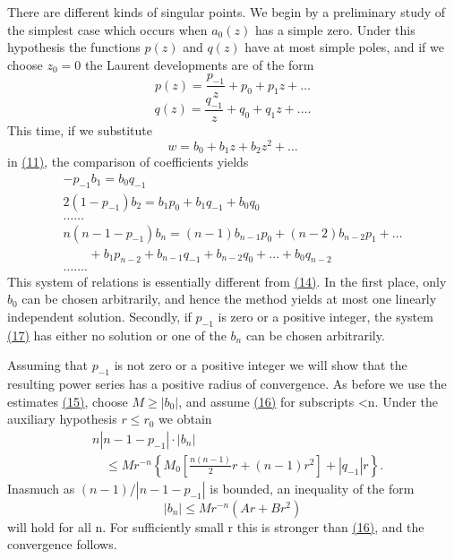 There are different kinds of singular points. We begin by a preliminary study of the simplest case which occurs when $a_{0}(z)$ has a simple zero. Under this hypothesis the functions $p(z)$ and $q(z)$ have at most simple poles, and if we choose $z_{0}=0$ the Laurent developments are of the form
\begin{equation*}
p (z) = \frac {p _ {- 1}}{z} + p _ {0} + p _ {1} z + \dots
\end{equation*}
\begin{equation*}
q (z) = \frac {q _ {- 1}}{z} + q _ {0} + q _ {1} z + \dots .
\end{equation*}
This time, if we substitute
\begin{equation*}
w = b _ {0} + b _ {1} z + b _ {2} z ^ {2} + \dots
\end{equation*}
in \hyperref[eq:8.11]{(11)}, the comparison of coefficients yields
\begin{equation*}
\begin{array}{l} - p _ {- 1} b _ {1} = b _ {0} q _ {- 1} \\ 2 (1 - p _ {- 1}) b _ {2} = b _ {1} p _ {0} + b _ {1} q _ {- 1} + b _ {0} q _ {0} \\ \dots \dots \\ n (n - 1 - p _ {- 1}) b _ {n} = (n - 1) b _ {n - 1} p _ {0} + (n - 2) b _ {n - 2} p _ {1} + \dots \\ \qquad + b _ {1} p _ {n - 2} + b _ {n - 1} q _ {- 1} + b _ {n - 2} q _ {0} + \dots + b _ {0} q _ {n - 2} \\ \dots \dots . \end{array}\tag{17}\label{eq:8.17}
\end{equation*}
This system of relations is essentially different from \hyperref[eq:8.14]{(14)}. In the first place, only $b_{0}$ can be chosen arbitrarily, and hence the method yields at most one linearly independent solution. Secondly, if $p_{-1}$ is zero or a positive integer, the system \hyperref[eq:8.17]{(17)} has either no solution or one of the $b_{n}$ can be chosen arbitrarily.

Assuming that $p_{-1}$ is not zero or a positive integer we will show that the resulting power series has a positive radius of convergence. As before we use the estimates \hyperref[eq:8.15]{(15)}, choose $M \geq |b_{0}|$, and assume \hyperref[eq:8.16]{(16)} for subscripts <n. Under the auxiliary hypothesis $r \leq r_{0}$ we obtain
\begin{equation*}
\begin{aligned}
&n|n-1-p_{-1}|\cdot|b_n|\\
&\quad\leq Mr^{-n}\left\{M_0\left[\frac{n(n-1)}2r+(n-1)r^2\right]+|q_{-1}|r\right\}.
\end{aligned}
\end{equation*}
Inasmuch as $(n - 1) / |n - 1 - p_{-1}|$ is bounded, an inequality of the form
\begin{equation*}
\left| b _ {n} \right| \leq M r ^ {- n} (A r + B r ^ {2})
\end{equation*}
will hold for all n. For sufficiently small r this is stronger than \hyperref[eq:8.16]{(16)}, and the convergence follows.

